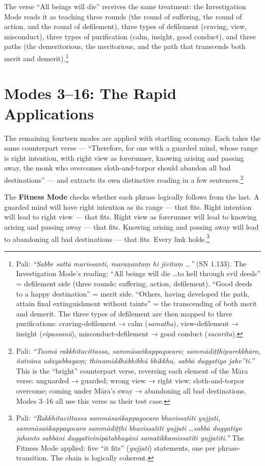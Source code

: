The verse ``All beings will die'' receives the same treatment: the Investigation Mode reads it as teaching three rounds (the round of suffering, the round of action, and the round of defilement), three types of defilement (craving, view, misconduct), three types of purification (calm, insight, good conduct), and three paths (the demeritorious, the meritorious, and the path that transcends both merit and demerit).\footnote{Pali: \textit{``Sabbe sattā marissanti, maraṇantaṃ hi jīvitaṃ \ldots''} (SN 1.133). The Investigation Mode's reading: ``All beings will die \ldots to hell through evil deeds'' = defilement side (three rounds: suffering, action, defilement). ``Good deeds to a happy destination'' = merit side. ``Others, having developed the path, attain final extinguishment without taints'' = the transcending of both merit and demerit. The three types of defilement are then mapped to three purifications: craving-defilement → calm (\textit{samatha}), view-defilement → insight (\textit{vipassanā}), misconduct-defilement → good conduct (\textit{sucarita}).}

\section*{Modes 3--16: The Rapid Applications}

The remaining fourteen modes are applied with startling economy. Each takes the same counterpart verse --- ``Therefore, for one with a guarded mind, whose range is right intention, with right view as forerunner, knowing arising and passing away, the monk who overcomes sloth-and-torpor should abandon all bad destinations'' --- and extracts its own distinctive reading in a few sentences.\footnote{Pali: \textit{``Tasmā rakkhitacittassa, sammāsaṅkappagocaro; sammādiṭṭhipurekkhāro, ñatvāna udayabbayaṃ; thinamiddhābhibhū bhikkhu, sabbā duggatiyo jahe''ti.''} This is the ``bright'' counterpart verse, reversing each element of the Māra verse: unguarded → guarded; wrong view → right view; sloth-and-torpor overcome; coming under Māra's sway → abandoning all bad destinations. Modes 3--16 all use this verse as their test case.}

The \textbf{Fitness Mode} checks whether each phrase logically follows from the last. A guarded mind will have right intention as its range --- that fits. Right intention will lead to right view --- that fits. Right view as forerunner will lead to knowing arising and passing away --- that fits. Knowing arising and passing away will lead to abandoning all bad destinations --- that fits. Every link holds.\footnote{Pali: \textit{``Rakkhitacittassa sammāsaṅkappagocaro bhavissatīti yujjati, sammāsaṅkappagocaro sammādiṭṭhi bhavissatīti yujjati \ldots sabbā duggatiyo jahanto sabbāni duggativinipātabhayāni samatikkamissatīti yujjatīti.''} The Fitness Mode applied: five ``it fits'' (\textit{yujjati}) statements, one per phrase-transition. The chain is logically coherent.}

